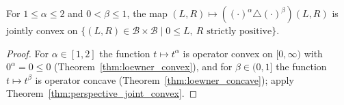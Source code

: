 \begin{theorem}
  \label{thm:power_mean_convex}
  \leanok
  For $1 \leq \alpha \leq 2$ and $0 < \beta \leq 1$, the map
  $(L, R) \mapsto ((\cdot)^\alpha \triangle (\cdot)^\beta)(L, R)$
  is jointly convex on
  $\{ (L, R) \in \mathcal{B} \times \mathcal{B} \mid 0 \leq L,\ R \text{ strictly positive} \}$.
  \begin{proof}
    \leanok
    For $\alpha \in [1,2]$ the function $t \mapsto t^\alpha$ is operator convex on
    $[0,\infty)$ with $0^\alpha = 0 \leq 0$ (Theorem~\ref{thm:loewner_convex}),
    and for $\beta \in (0,1]$ the function $t \mapsto t^\beta$ is operator concave
    (Theorem~\ref{thm:loewner_concave}); apply Theorem~\ref{thm:perspective_joint_convex}.
  \end{proof}
\end{theorem}
